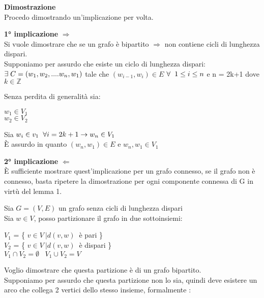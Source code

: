 \documentclass{article}
\begin{document}
\textbf{Dimostrazione} \\
Procedo dimostrando un'implicazione per volta. 

\textbf{1° implicazione} $\Rightarrow$ \\ 
Si vuole dimostrare che se un grafo è bipartito $\Rightarrow$ non contiene 
cicli di lunghezza dispari. \\
Supponiamo per assurdo che esiste un ciclo di lunghezza dispari: \\ 
$\exists \hspace{1mm} C = (w_{1},w_{2},. . . . w_{n},w_{1})$ tale che $(w_{i-1},w_{i}) \in E$ $ \forall \hspace{2mm} 1 \leq i \leq n$
e n = 2k+1 dove $k \in \mathbb{Z} $

Senza perdita di generalità sia: \\ 

\begin{center}
$w_{1} \in V_{1}$  \\
$w_{2} \in V_{2}$  \\ 
\end{center}

Sia $w_{i} \in v_{1} \hspace{2mm} \forall i=2k+1  \rightarrow w_{n} \in V_{1}$\\
È assurdo in quanto $(w_{n},w_{1}) \in E$ \hspace{1mm} e  $w_{n},w_{1} \in V_{1}$ 

\textbf{2° implicazione} $\Leftarrow $ \\
È sufficiente mostrare quest'implicazione per un grafo connesso, se il grafo non 
è connesso, basta ripetere la dimostrazione per ogni componente connessa di G in 
virtù del lemma 1.


Sia $G=(V,E)$ un grafo senza cicli di lunghezza dispari\\
Sia $w \in V$, posso partizionare il grafo in due sottoinsiemi: 

\begin{center}
  $V_{1}$ = \{ $ v \in V \: | d(v,w) \:$ è pari  \} \\ 
  $V_{2}$ = \{ $ v \in V \: | d(v,w) \:$ è dispari  \} \\ 
  $V_{1} \cap V_{2} =  \emptyset \;\;\; V_{1} \cup V_{2} = V$
\end{center}

Voglio dimostrare che questa partizione è di un grafo bipartito. \\
Supponiamo per assurdo che questa partizione non lo sia,
quindi deve esistere un arco che collega 2 vertici dello stesso insieme, formalmente :
\end{document}
